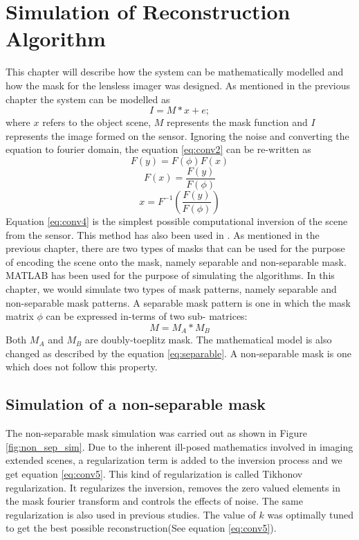 \chapter{Simulation of Reconstruction Algorithm}
This chapter will describe how the system can be mathematically modelled and how the mask for the lensless imager was designed. As mentioned in the previous chapter the system can be modelled as 
\begin{equation}
\label{eq:conv2}
I = M * x + e ;
\end{equation}
where $x$ refers to the object scene, $M$ represents the mask function and $I$ represents the image formed on the sensor. Ignoring the noise and converting the equation to fourier domain, the equation \ref{eq:conv2} can be re-written as
\begin{equation}
\label{eq:conv3}
F(y) = F(\phi)F(x)
\end{equation}
\begin{equation}
\label{eq:conv3}
F(x) = \frac{F(y)}{F(\phi)}
\end{equation}
\begin{equation}
\label{eq:conv4}
x = F^{-1}(\frac{F(y)}{F(\phi)})
\end{equation}
Equation \ref{eq:conv4} is the simplest possible computational inversion of the scene from the sensor. This method has also been used in \cite{Toeplitz}. As mentioned in the previous chapter, there are two types of masks that can be used for the purpose of encoding the scene onto the mask, namely separable and non-separable mask. MATLAB has been used for the purpose of simulating the algorithms. In this chapter, we would simulate two types of mask patterns, namely separable and non-separable mask patterns. A separable mask pattern is one in which the mask matrix $\phi$ can be expressed in-terms of two sub- matrices:
\begin{equation}
M = M_A * M_B
\end{equation}
Both $M_A$ and $M_B$ are doubly-toeplitz mask. The mathematical model is also changed as described by the equation \ref{eq:separable}. A non-separable mask is one which does not follow this property.

\section{Simulation of a non-separable mask}
The non-separable mask simulation was carried out as shown in Figure \ref{fig:non_sep_sim}. Due to the inherent ill-posed mathematics involved in imaging extended scenes, a regularization term is added to the inversion process and we get equation \ref{eq:conv5}. This kind of regularization is called Tikhonov regularization. It regularizes the inversion, removes the zero valued elements in the mask fourier transform and controls the effects of noise\cite{Toeplitz}. The same regularization is also used in previous studies\cite{Toeplitz}. The value of $k$ was optimally tuned to get the best possible reconstruction(See equation \ref{eq:conv5}).

